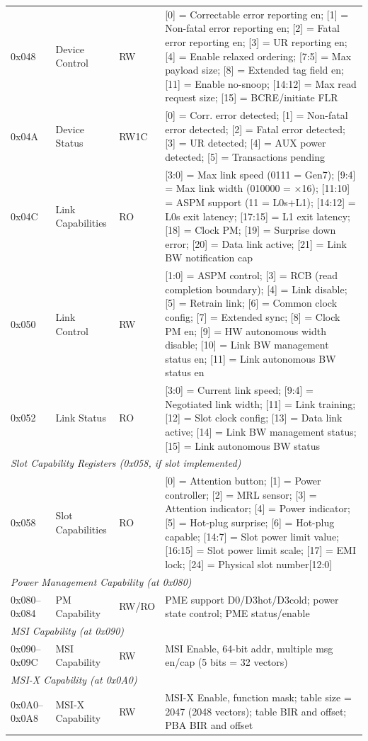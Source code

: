 \documentclass[11pt,a4paper]{article}
\begin{document}
\begin{longtable}{p{2.5cm}p{4.5cm}p{1.5cm}p{5.5cm}}
  0x048        & Device Control     & RW    & [0] = Correctable error reporting en; [1] = Non-fatal error reporting en; [2] = Fatal error reporting en; [3] = UR reporting en; [4] = Enable relaxed ordering; [7:5] = Max payload size; [8] = Extended tag field en; [11] = Enable no-snoop; [14:12] = Max read request size; [15] = BCRE/initiate FLR \\
  0x04A        & Device Status      & RW1C  & [0] = Corr. error detected; [1] = Non-fatal error detected; [2] = Fatal error detected; [3] = UR detected; [4] = AUX power detected; [5] = Transactions pending \\
  0x04C        & Link Capabilities  & RO    & [3:0] = Max link speed (0111 = Gen7); [9:4] = Max link width (010000 = $\times$16); [11:10] = ASPM support (11 = L0s+L1); [14:12] = L0s exit latency; [17:15] = L1 exit latency; [18] = Clock PM; [19] = Surprise down error; [20] = Data link active; [21] = Link BW notification cap \\
  0x050        & Link Control       & RW    & [1:0] = ASPM control; [3] = RCB (read completion boundary); [4] = Link disable; [5] = Retrain link; [6] = Common clock config; [7] = Extended sync; [8] = Clock PM en; [9] = HW autonomous width disable; [10] = Link BW management status en; [11] = Link autonomous BW status en \\
  0x052        & Link Status        & RO    & [3:0] = Current link speed; [9:4] = Negotiated link width; [11] = Link training; [12] = Slot clock config; [13] = Data link active; [14] = Link BW management status; [15] = Link autonomous BW status \\
  \midrule
  \multicolumn{4}{l}{\textit{Slot Capability Registers (0x058, if slot implemented)}} \\
  \midrule
  0x058        & Slot Capabilities  & RO    & [0] = Attention button; [1] = Power controller; [2] = MRL sensor; [3] = Attention indicator; [4] = Power indicator; [5] = Hot-plug surprise; [6] = Hot-plug capable; [14:7] = Slot power limit value; [16:15] = Slot power limit scale; [17] = EMI lock; [24] = Physical slot number[12:0] \\
  \midrule
  \multicolumn{4}{l}{\textit{Power Management Capability (at 0x080)}} \\
  \midrule
  0x080--0x084 & PM Capability      & RW/RO & PME support D0/D3hot/D3cold; power state control; PME status/enable \\
  \midrule
  \multicolumn{4}{l}{\textit{MSI Capability (at 0x090)}} \\
  \midrule
  0x090--0x09C & MSI Capability     & RW    & MSI Enable, 64-bit addr, multiple msg en/cap (5 bits = 32 vectors) \\
  \midrule
  \multicolumn{4}{l}{\textit{MSI-X Capability (at 0x0A0)}} \\
  \midrule
  0x0A0--0x0A8 & MSI-X Capability   & RW    & MSI-X Enable, function mask; table size = 2047 (2048 vectors); table BIR and offset; PBA BIR and offset \\
  \bottomrule
\end{longtable}
\end{document}
